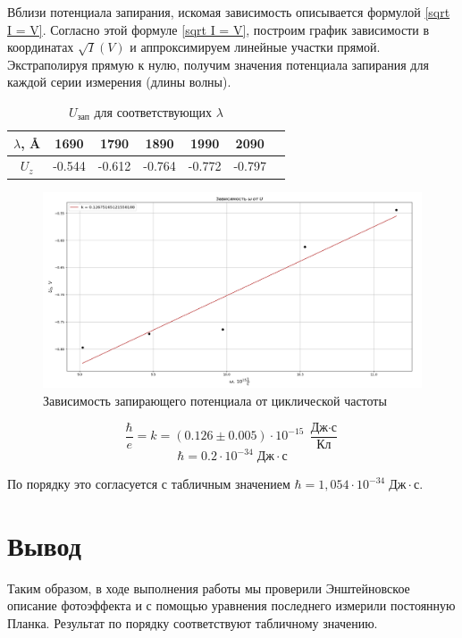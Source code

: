 \documentclass[a4paper,12pt]{article}
\theoremstyle{definition}
\begin{document}
	Вблизи потенциала запирания, искомая зависимость описывается формулой \eqref{sqrt I = V}. 
	Согласно этой формуле \eqref{sqrt I = V}, построим график зависимости в координатах 
	$ \sqrt{I} (V) $ и аппроксимируем линейные участки прямой. Экстраполируя прямую к нулю, 
	получим значения потенциала запирания для каждой серии измерения (длины волны). 

	\begin{table}[h]
		\centering
		\caption{$U_{\text{зап}}$ для соответствующих $\lambda$}
		\begin{tabular}{|c||c|c|c|c|c|c|} \hline
			$\lambda$, \AA & 1690 & 1790 & 1890 & 1990 & 2090 \\ \hline
			$U_z$ & -0.544 & -0.612 & -0.764 & -0.772  & -0.797 \\ \hline		
		\end{tabular}
	\end{table}

	\begin{figure}[H]
		\centering
		\includegraphics[width = \textwidth]{ashnu.png}
		\caption{Зависимость запирающего потенциала от циклической частоты} 
	\end{figure}

	\begin{equation*}
		\frac{\hbar}{e} = k = (0.126 \pm 0.005) \cdot 10^{-15} \; \dfrac{\text{Дж}\cdot\text{с}}{\text{Кл}}
	\end{equation*}
	\begin{equation*}
		\hbar = 0.2 \cdot 10^{-34} \; \text{Дж}\cdot\text{с}
	\end{equation*}
        	 
	По порядку это согласуется с табличным значением $ \hbar = 1,054 \cdot 10^{-34} \; \text{Дж} \cdot \text{с} $.

	\section{Вывод}
	
	Таким образом, в ходе выполнения работы мы проверили Энштейновское описание фотоэффекта и с помощью уравнения последнего измерили постоянную Планка. Результат по порядку соответствуют табличному значению.
	
\end{document}
